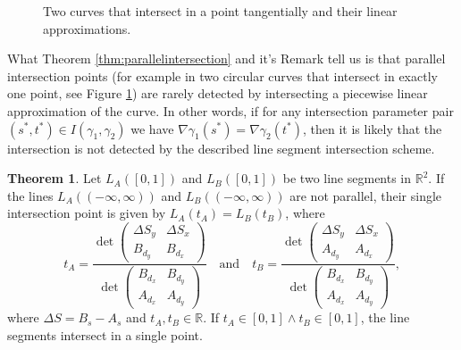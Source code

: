 \documentclass[a4paper, 11pt]{report}
\theoremstyle{definition}
\newtheorem{theorem}[definition]{Theorem}
\begin{document}
	\begin{figure}[H]
		\centering
		
		\caption{Two curves that intersect in a point tangentially and their linear approximations.}
		\label{fig:tangentialintersection}
	\end{figure}

	What Theorem \ref{thm:parallelintersection} and it's Remark tell us is that parallel intersection points (for example in two circular curves that intersect in exactly one point, see Figure \ref{fig:tangentialintersection}) are rarely detected by intersecting a piecewise linear approximation of the curve. In other words, if for any intersection parameter pair $(s^*, t^*) \in I(\gamma_1, \gamma_2)$ we have $\nabla \gamma_1(s^*) = \nabla \gamma_2(t^*)$, then it is likely that the intersection is not detected by the described line segment intersection scheme.
 	
	\begin{theorem}\label{thm:lineintersection}
		Let $L_A([0,1])$ and $L_B([0,1])$ be two line segments in $\mathbb{R}^2$. If the lines $L_A((-\infty,\infty))$ and $L_B((-\infty,\infty))$ are not parallel, their single intersection point is given by $L_A(t_A) = L_B(t_B)$, where
			\begin{equation*}\label{eq:lineintersection}
				t_A = 
				\frac {
					\det
					\begin{pmatrix}
						\Delta S_y 	& \Delta S_x		\\
						B_{d_y}	& B_{d_x}
					\end{pmatrix}
				}
				{
					\det
					\begin{pmatrix}
						B_{d_x} & B_{d_y} 	\\
						A_{d_x} & A_{d_y}
					\end{pmatrix}
				}
				\quad\text{and}\quad
				t_B =
				\frac {
					\det
					\begin{pmatrix}
						\Delta S_y 	& \Delta S_x		\\
						A_{d_y}	& A_{d_x}
					\end{pmatrix}
				}
				{
					\det
					\begin{pmatrix}
						B_{d_x} & B_{d_y} 	\\
						A_{d_x} & A_{d_y}
					\end{pmatrix}
				},
			\end{equation*}
		where $\Delta S = B_s - A_s$ and $t_A, t_B \in \mathbb{R}$. If $t_A \in [0,1] \wedge t_B \in [0,1]$, the line segments intersect in a single point.
	\end{theorem}
	
\end{document}
